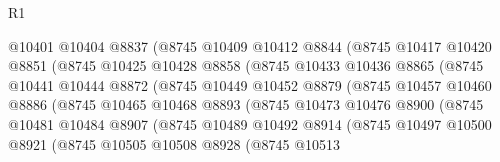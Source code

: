 \begin{lexlean}{R1}
\begin{coremodule}
                          @10401
                          @10404
                          @8837
                          (@8745
                            @10409
                            @10412
                            @8844
                            (@8745
                              @10417
                              @10420
                              @8851
                              (@8745
                                @10425
                                @10428
                                @8858
                                (@8745
                                  @10433
                                  @10436
                                  @8865
                                  (@8745
                                    @10441
                                    @10444
                                    @8872
                                    (@8745
                                      @10449
                                      @10452
                                      @8879
                                      (@8745
                                        @10457
                                        @10460
                                        @8886
                                        (@8745
                                          @10465
                                          @10468
                                          @8893
                                          (@8745
                                            @10473
                                            @10476
                                            @8900
                                            (@8745
                                              @10481
                                              @10484
                                              @8907
                                              (@8745
                                                @10489
                                                @10492
                                                @8914
                                                (@8745
                                                  @10497
                                                  @10500
                                                  @8921
                                                  (@8745
                                                    @10505
                                                    @10508
                                                    @8928
                                                    (@8745
                                                      @10513

\end{coremodule}
\end{lexlean}
